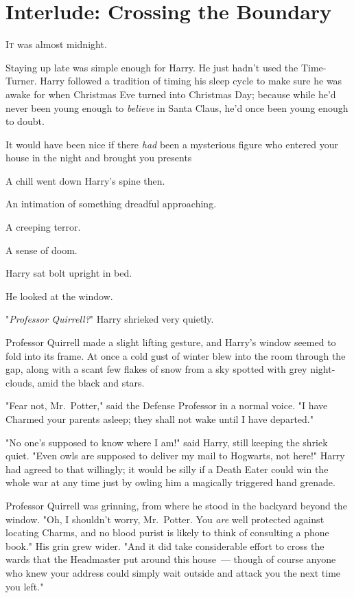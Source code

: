 \chapter{Interlude: Crossing the Boundary}

\lettrine{I}{t} was almost
midnight.

Staying up late was simple enough for Harry. He just hadn't used the
Time-Turner. Harry followed a tradition of timing his sleep cycle to make sure
he was awake for when Christmas Eve turned into Christmas Day; because while
he'd never been young enough to \emph{believe} in Santa Claus, he'd once been
young enough to doubt.

It would have been nice if there \emph{had} been a mysterious figure who
entered your house in the night and brought you presents{\el}

A chill went down Harry's spine then.

An intimation of something dreadful approaching.

A creeping terror.

A sense of doom.

Harry sat bolt upright in bed.

He looked at the window.

"\emph{Professor Quirrell?}" Harry shrieked very quietly.

Professor Quirrell made a slight lifting gesture, and Harry's window seemed to
fold into its frame. At once a cold gust of winter blew into the room through
the gap, along with a scant few flakes of snow from a sky spotted with grey
night-clouds, amid the black and stars.

"Fear not, Mr.~Potter," said the Defense Professor in a normal voice. "I have
Charmed your parents asleep; they shall not wake until I have departed."

"No one's supposed to know where I am!" said Harry, still keeping the shriek
quiet. "Even owls are supposed to deliver my mail to Hogwarts, not here!" Harry
had agreed to that willingly; it would be silly if a Death Eater could win the
whole war at any time just by owling him a magically triggered hand grenade.

Professor Quirrell was grinning, from where he stood in the backyard beyond the
window. "Oh, I shouldn't worry, Mr.~Potter. You \emph{are} well protected
against locating Charms, and no blood purist is likely to think of consulting a
phone book." His grin grew wider. "And it did take considerable effort to cross
the wards that the Headmaster put around this house~--- though of course anyone
who knew your address could simply wait outside and attack you the next time
you left."

